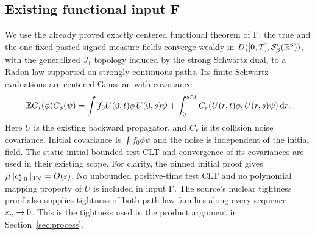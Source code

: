 \subsection{Existing functional input F}
We use the already proved exactly centered functional theorem of F: the true
and the one fixed pasted signed-measure fields converge weakly in
$D([0,T],\mathcal S'_\beta(\mathbb R^6))$, with the generalized $J_1$ topology induced
by the strong Schwartz dual, to a Radon law supported on strongly continuous
paths. Its finite Schwartz evaluations are centered Gaussian with covariance
\begin{equation}\label{eq:field-cov}
 \mathbb E G_t(\phi)G_s(\psi)
 =\int f_0 U(0,t)\phi\,U(0,s)\psi
  +\int_0^{s\wedge t}C_r(U(r,t)\phi,U(r,s)\psi)\,\mathrm d r.
\end{equation}
Here $U$ is the existing backward propagator, and $C_r$ is its collision
noise covariance. Initial covariance is $\int f_0\phi\psi$ and the noise
is independent of the initial field. The static initial bounded-test CLT
and convergence of its covariances are used in their existing scope.
For clarity, the pinned initial proof gives
$\mu\|c_{2,0}^\varepsilon\|_{\mathrm{TV}}=O(\varepsilon)$.
No unbounded positive-time test CLT and no polynomial mapping property
of $U$ is included in input F.
The source's nuclear tightness proof also supplies tightness of both path-law
families along every sequence $\varepsilon_n\to0$. This is the tightness used in
the product argument in Section~\ref{sec:process}.
